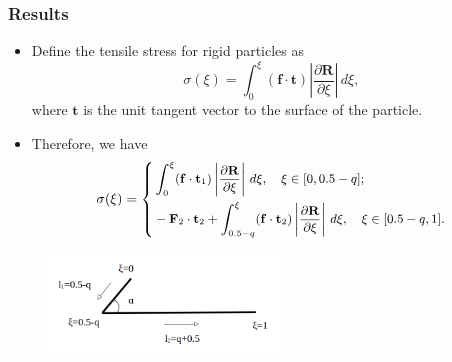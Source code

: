 \documentclass{beamer}
\begin{document}
\begin{frame}
\begin{overlayarea}{\textwidth}{\textheight}
\begin{itemize}
\begin{figure}
\begin{minipage}{0.49\linewidth}
		\end{minipage}
	\end{figure}
	
\end{itemize}
	\end{overlayarea}
\end{frame}



\begin{frame}
	\frametitle{Results}
	\begin{overlayarea}{\textwidth}{\textheight}
		\vspace{-0.3cm}
	\begin{itemize}
		\item \small Define the tensile stress for rigid particles as 
		\begin{equation*}
			\sigma(\xi)=\int_0^\xi (\mathbf{f}\cdot\mathbf{t}) \left |\frac{\partial \mathbf{R}}{\partial \xi}\right|\,d\xi,
		\end{equation*}
		where $\mathbf{t}$ is the unit tangent vector to the surface of the particle. 
	\item \small Therefore, we have 
	\begin{equation*}\small 
		\sigma(\xi)=\left\{
		\begin{aligned}
			\label{eq:4}
			&\int_0^\xi (\mathbf{f}\cdot\mathbf{t}_1) \left |\frac{\partial \mathbf{R}}{\partial \xi}\right|\,d\xi,\quad \xi\in[0,0.5-q];\\
			&-\mathbf{F}_2\cdot\mathbf{t}_2+\int_{0.5-q}^\xi (\mathbf{f}\cdot\mathbf{t}_2) \left |\frac{\partial \mathbf{R}}{\partial \xi}\right|\,d\xi, \quad \xi\in[0.5-q,1].
		\end{aligned}\right.
	\end{equation*}
	\end{itemize}\vspace{-0.4cm}
	\begin{figure}[htb]
	\begin{center}
		\includegraphics[width=0.55\textwidth]{plots/tensile_boomerang.png}
	\end{center}
\end{figure}
	\end{overlayarea}
\end{frame}
\end{document}
